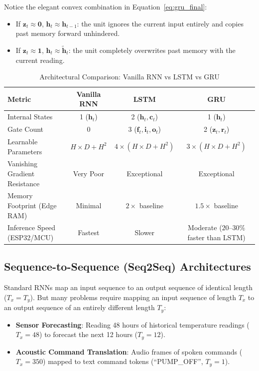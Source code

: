 Notice the elegant convex combination in Equation~\eqref{eq:gru_final}:
\begin{itemize}
    \item If $\mathbf{z}_t \approx \mathbf{0}$, $\mathbf{h}_t \approx \mathbf{h}_{t-1}$: the unit ignores the current input entirely and copies past memory forward unhindered.
    \item If $\mathbf{z}_t \approx \mathbf{1}$, $\mathbf{h}_t \approx \tilde{\mathbf{h}}_t$: the unit completely overwrites past memory with the current reading.
\end{itemize}

\begin{table}[htbp]
\centering
\small
\caption{Architectural Comparison: Vanilla RNN vs LSTM vs GRU}\label{tab:rnn_lstm_gru}
\begin{tabular}{lccc}
\toprule
\textbf{Metric} & \textbf{Vanilla RNN} & \textbf{LSTM} & \textbf{GRU} \\
\midrule
Internal States & 1 ($\mathbf{h}_t$) & 2 ($\mathbf{h}_t, \mathbf{c}_t$) & 1 ($\mathbf{h}_t$) \\
Gate Count & 0 & 3 ($\mathbf{f}_t, \mathbf{i}_t, \mathbf{o}_t$) & 2 ($\mathbf{z}_t, \mathbf{r}_t$) \\
Learnable Parameters & $H \times D + H^2$ & $4 \times (H \times D + H^2)$ & $3 \times (H \times D + H^2)$ \\
Vanishing Gradient Resistance & Very Poor & Exceptional & Exceptional \\
Memory Footprint (Edge RAM) & Minimal & $2\times$ baseline & $1.5\times$ baseline \\
Inference Speed (ESP32/MCU) & Fastest & Slower & Moderate ($20\text{--}30\%$ faster than LSTM) \\
\bottomrule
\end{tabular}
\end{table}

\subsection{Sequence-to-Sequence (Seq2Seq) Architectures}\label{subsec:seq2seq}

Standard RNNs map an input sequence to an output sequence of identical length ($T_x = T_y$). But many problems require mapping an input sequence of length $T_x$ to an output sequence of an entirely different length $T_y$:
\begin{itemize}
    \item \textbf{Sensor Forecasting}: Reading 48 hours of historical temperature readings ($T_x = 48$) to forecast the next 12 hours ($T_y = 12$).
    \item \textbf{Acoustic Command Translation}: Audio frames of spoken commands ($T_x = 350$) mapped to text command tokens (``PUMP\_OFF'', $T_y = 1$).
\end{itemize}

